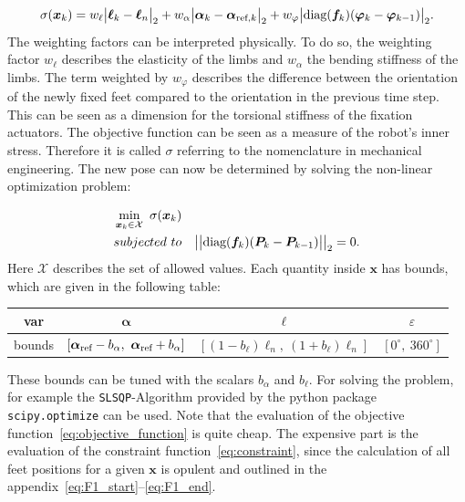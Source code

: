 \documentclass[10pt,a4paper]{article}
\begin{document}
\begin{equation}
\sigma(\bm{x}_{k}) = %
  w_\ell\big| \bm{\ell}_{k} - \bm{\ell}_n \big|_2
+ w_\alpha\big| \bm{\alpha}_{k} - \bm{\alpha}_{\textnormal{ref},k} \big|_2
+ w_\varphi \big| \textnormal{diag}(\bm{f}_k) ( \bm{\varphi}_{k} - \bm{\varphi}_{k-1}) \big|_2 .
\label{eq:objective_function}
\end{equation}
The weighting factors can be interpreted physically.
To do so, the weighting factor $w_\ell$ describes the elasticity of the limbs and $w_\alpha$ the bending stiffness of the limbs.
The term weighted by $w_\varphi$ describes the difference between the orientation of the newly fixed feet compared to the orientation in the previous time step.
This can be seen as a dimension for the torsional stiffness of the fixation actuators.
The objective function can be seen as a measure of the robot's inner stress.
Therefore it is called $\sigma$ referring to the nomenclature in mechanical engineering.
The new pose can now be determined by solving the non-linear optimization problem:

\begin{equation}
\begin{split}
&\min_{\bm{x}_k \in \mathcal{X}} ~ \sigma(\bm{x}_k) \\
&subjected~to~~~
\big|\big|\textnormal{diag}(\bm{f}_k)(\bm{P}_{k} - \bm{P}_{k-1})\big|\big|_2 = 0.
\end{split}
\end{equation}
Here  $\mathcal{X}$ describes the set of allowed values.
Each quantity inside $\bm{x}$ has bounds, which are given in the following table:

\begin{center}
\begin{tabular}{c|c|c|c}
var & $\bm{\alpha}$ & $\bm{\ell}$ & $\varepsilon$ \\ 
\hline
bounds & $\left[ \bm{\alpha_{\textnormal{ref}}}-b_\alpha,~\bm{\alpha_{\textnormal{ref}}}+b_\alpha \right]$ &
$\left[ (1-b_\ell)\bm{\ell}_n,~(1+b_\ell)\bm{\ell}_n \right]$ &
$\left[ 0^\circ,~ 360^\circ \right]$
\end{tabular}
\end{center}
These bounds can be tuned with the scalars $b_\alpha$ and $b_\ell$.
For solving the problem, for example the \texttt{SLSQP}-Algorithm provided by the python package \texttt{scipy.optimize} can be used.
Note that the evaluation of the objective function~\eqref{eq:objective_function} is quite cheap. 
The expensive part is the evaluation of the constraint function~\eqref{eq:constraint}, since the calculation of all feet positions for a given $\bm{x}$ is opulent and outlined in the appendix~\eqref{eq:F1_start}--\eqref{eq:F1_end}.
\end{document}
